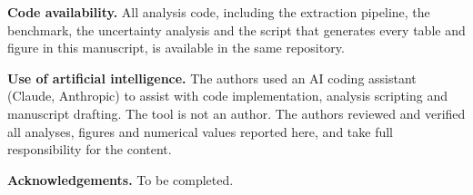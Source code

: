 \textbf{Code availability.} All analysis code, including the extraction pipeline, the
benchmark, the uncertainty analysis and the script that generates every table and figure in
this manuscript, is available in the same repository.

\textbf{Use of artificial intelligence.} The authors used an AI coding assistant
(Claude, Anthropic) to assist with code implementation, analysis scripting and manuscript
drafting. The tool is not an author. The authors reviewed and verified all analyses, figures
and numerical values reported here, and take full responsibility for the content.

\textbf{Acknowledgements.} To be completed.






